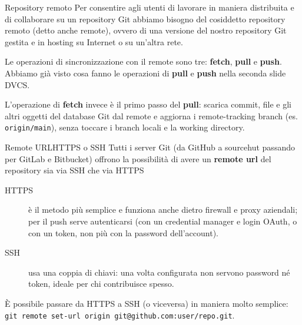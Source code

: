 \documentclass[aspectratio=169,handout,10pt]{beamer}
\begin{document}
\begin{frame}{Repository remoto}
    Per consentire agli utenti di lavorare in maniera distribuita e di collaborare su un repository Git abbiamo bisogno del cosiddetto repository remoto (detto anche remote), ovvero di una versione del nostro repository Git gestita e in hosting su Internet o su un'altra rete.

    Le operazioni di sincronizzazione con il remote sono tre: \textbf{fetch}, \textbf{pull} e \textbf{push}. Abbiamo già visto cosa fanno le operazioni di \textbf{pull} e \textbf{push} nella seconda slide DVCS.

    L'operazione di \textbf{fetch} invece è il primo passo del \textbf{pull}: scarica commit, file e gli altri oggetti del database Git dal remote e aggiorna i remote-tracking branch (es. \texttt{origin/main}), senza toccare i branch locali e la working directory.
    
\end{frame}
\begin{frame}[fragile]{Remote URL}{HTTPS o SSH}
    Tutti i server Git (da GitHub a sourcehut passando per GitLab e Bitbucket) offrono la possibilità di avere un \textbf{remote url} del repository sia via SSH che via HTTPS
    \begin{description}
        \item[HTTPS] è il metodo più semplice e funziona anche dietro firewall e proxy aziendali; per il push serve autenticarsi (con un credential manager e login OAuth, o con un token, non più con la password dell'account).
        \item[SSH] usa una coppia di chiavi: una volta configurata non servono password né token, ideale per chi contribuisce spesso.
    \end{description}

    È possibile passare da HTTPS a SSH (o viceversa) in maniera molto semplice: \lstinline{git remote set-url origin git@github.com:user/repo.git}.

\end{frame}
\end{document}
